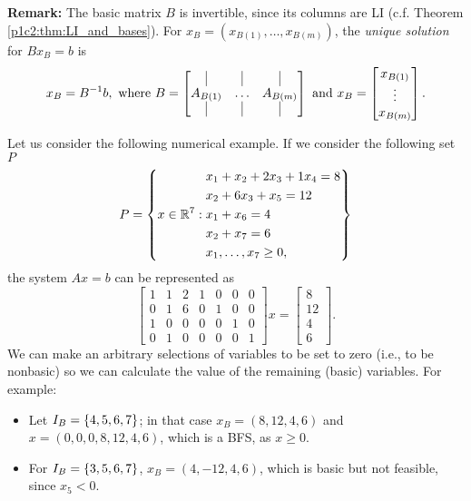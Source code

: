 {\bf Remark:} The basic matrix $B$ is invertible, since its columns are LI (c.f. Theorem \ref{p1c2:thm:LI_and_bases}). For $x_B = (x_{B(1)}, \dots, x_{B(m)})$, the \emph{unique solution} for $Bx_B = b$ is 
%
\begin{equation*}
	x_B = B^{-1}b, \text{ where } 
	B = \begin{bmatrix} \vline & \vline & \vline \\
					  A_{B(1)} & \dots & A_{B(m)} \\
	    	    		\vline & \vline & \vline	
		\end{bmatrix} \text{ and } 
	x_B =  \begin{bmatrix}   x_{B(1)} \\
		 			     		 \vdots   \\
		 			     		 x_{B(m)}	
		   \end{bmatrix}.
\end{equation*}
%

Let us consider the following numerical example. If we consider the following set $P$
%
\begin{equation}  \label{p1c3:eq:example_P}
	P = \left\{x \in \mathbb{R}^7 :  
		\begin{aligned}
			& x_1 + x_2 + 2x_3 + 1x_4 = 8 \\
			& x_2 + 6 x_3 + x_5 = 12 \\
			& x_1 + x_6 = 4 \\
			& x_2 + x_7 =6 \\
			& x_1, \dots, x_7 \ge 0,
		\end{aligned}
		\right\} 	
\end{equation}
%
the system $Ax=b$ can be represented as 
%  
\begin{equation*}
	\begin{bmatrix}
		1 & 1 & 2 & 1 & 0 & 0 & 0 \\
		0 & 1 & 6 & 0 & 1 & 0 & 0 \\
		1 & 0 & 0 & 0 & 0 & 1 & 0 \\
		0 & 1 & 0 & 0 & 0 & 0 & 1
	\end{bmatrix} x =
	\begin{bmatrix}
		8  \\
		12 \\
		4  \\
		6   	
	\end{bmatrix}.
\end{equation*}
%
We can make an arbitrary selections of variables to be set to zero (i.e., to be nonbasic) so we can calculate the value of the remaining (basic) variables. For example:
\begin{itemize}
	\item Let $I_B = \left\{ 4, 5, 6, 7 \right \}$; in that case $x_B = (8,12,4,6)$ and $x = (0,0,0,8,12,4,6)$, which is a BFS, as $x \geq 0$.

	\item For $I_B = \left\{ 3,5,6,7 \right \}$, $x_B = (4,-12,4,6)$, which is basic but not feasible, since $x_5 < 0$.	
\end{itemize}



